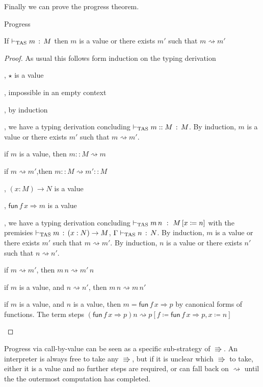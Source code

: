 
Finally we can prove the progress theorem.
\begin{thm}
Progress 

If $\vdash_{\mathrm{TAS}} m\,:\,M$ then $m$ is a value or there exists $m'$ such that $m\rightsquigarrow m'$
\end{thm}

\begin{proof}
As usual this follows form induction on the typing derivation

\begin{casenv}
  \item {}, $\star$ is a value 
  \item {}, impossible in an empty context
  \item {}, by induction
  \item {}, we have a typing derivation concluding $\vdash_{\mathrm{TAS}} m::M\,:\,M$.
  By induction, $m$ is a value or there exists $m'$ such that $m\rightsquigarrow m'$.
  \begin{casenv}
    \item if $m$ is a value, then $m::M\rightsquigarrow m$ 
    \item if $m\rightsquigarrow m'$,then $m::M\rightsquigarrow m'::M$
  \end{casenv}
  \item {}, $\left(x:M\right)\rightarrow N$ is a value
  \item {}, $\mathsf{fun}\,f\,x\Rightarrow m$ is a value
  \item {}, we have a typing derivation concluding $\vdash_{\mathrm{TAS}} m\,n\ :\ M\left[x\coloneqq n\right]$ with the premisies $\vdash_{\mathrm{TAS}} m\,:\,\left(x:N\right)\rightarrow M$, $\Gamma\vdash_{\mathrm{TAS}} n\,:\,N$.
  By induction, $m$ is a value or there exists $m'$ such that $m\rightsquigarrow m'$.
  By induction, $n$ is a value or there exists $n'$ such that $n\rightsquigarrow n'$.
  \begin{casenv}
    \item if $m\rightsquigarrow m'$, then $m\,n\rightsquigarrow m'\,n$
    \item if $m$ is a value, and $n\rightsquigarrow n'$,  then $m\,n\rightsquigarrow m\,n'$
    \item if $m$ is a value, and $n$ is a value, then $m=\mathsf{fun}\,f\,x\Rightarrow p$ by canonical forms of functions.
      The term steps $\left(\mathsf{fun}\,f\,x\Rightarrow p\right)n\rightsquigarrow p\left[f\coloneqq\mathsf{fun}\,f\,x\Rightarrow p,x\coloneqq n\right]$
  \end{casenv}
\end{casenv}

\end{proof}
Progress via call-by-value can be seen as a specific sub-strategy of $\Rrightarrow$.
An interpreter is always free to take any $\Rrightarrow$, but if it is unclear which $\Rrightarrow$ to take, either it is a value and no further steps are required, or can fall back on $\rightsquigarrow$ until the the outermost computation has completed.


